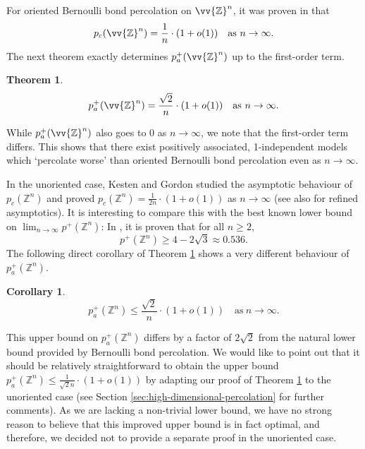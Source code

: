 \documentclass[11pt]{article}
\newcommand{\Z}{\mathbb{Z}}
\newtheorem{theorem}{Theorem}
\newtheorem{corollary}{Corollary}
\theoremstyle{remark}
\begin{document}
For oriented Bernoulli bond percolation on $\vv{\Z}^n$, it was proven in \cite{Cox1983} that 
\begin{equation}
    p_c(\vv{\Z}^n) = \frac{1}{n} \cdot (1+o(1)) \quad \text{as} \ n \to \infty. 
\end{equation} 
The next theorem exactly determines $p_a^+(\vv{\Z}^n)$ up to the first-order term. 
\begin{theorem} \label{thm:oriented-d-large}
	\begin{equation*}
		p_a^+(\vv{\Z}^n) = \frac{\sqrt{2}}{n} \cdot (1+o(1)) \quad \text{as}\ n \to \infty.
	\end{equation*}
\end{theorem}
While $p_a^+(\vv{\Z}^n)$ also goes to 0 as $n\to \infty$, we note that the first-order term differs. This shows that there exist positively associated, 1-independent models which `percolate worse' than oriented Bernoulli bond percolation even as $n \to \infty$. 

In the unoriented case, Kesten \cite{Kesten1990} and Gordon \cite{Gordon1991} studied the asymptotic behaviour of $p_c(\Z^n)$ and proved $p_c(\Z^n) = \frac{1}{2n} \cdot (1+o(1))$ as $n \to \infty$ (see also \cite{Hara1990,Bollobas1994} for refined asymptotics). It is interesting to compare this with the best known lower bound on $\lim_{n \to \infty} p^+(\Z^n)$: In \cite{Day2020}, it is proven that for all $n\ge 2$,
\begin{equation*}
	p^+(\Z^n) \ge 4 - 2 \sqrt{3} \approx 0.536.
\end{equation*}
The following direct corollary of Theorem \ref{thm:oriented-d-large} shows a very different behaviour of $p_a^+(\Z^n)$.
\begin{corollary}\label{thm:unoriented-d-large}
    \begin{equation*}
		p_a^+(\Z^n) \le   \frac{\sqrt{2}}{n} \cdot (1+o(1)) \quad \text{as}\ n \to \infty.
	\end{equation*}
\end{corollary}
 This upper bound on $p_a^+(\Z^n)$ differs by a factor of $2\sqrt{2}$ from the natural lower bound provided by Bernoulli bond percolation. We would like to point out that it should be relatively straightforward to obtain the upper bound $p_a^+(\Z^n) \le \frac{1}{\sqrt{2}n} \cdot (1+o(1))$ by adapting our proof of Theorem \ref{thm:oriented-d-large} to the unoriented case (see Section \ref{sec:high-dimensional-percolation} for further comments). As we are lacking a non-trivial lower bound, we have no strong reason to believe that this improved upper bound is in fact optimal, and therefore, we decided not to provide a separate proof in the unoriented case.
\end{document}

